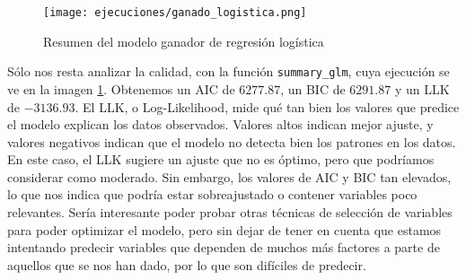 \documentclass[a4paper,onecolumn]{extarticle}
\begin{document}
\begin{sloppypar}
\begin{center}
    \begin{figure}[h]
        \centering
        \texttt{[image: ejecuciones/ganado\_logistica.png]}
        \caption{Resumen del modelo ganador de regresión logística}
        \label{fig:summarylog}
    \end{figure}
\end{center}

Sólo nos resta analizar la calidad, con la función \texttt{summary\_glm}, cuya ejecución se ve en la imagen \ref{fig:summarylog}. Obtenemos un AIC de $6277.87$, un BIC de 
$6291.87$ y un LLK de $-3136.93$. El LLK, o Log-Likelihood, mide qué tan bien los valores que predice el modelo explican los datos observados. Valores altos 
indican mejor ajuste, y valores negativos indican que el modelo no detecta bien los patrones en los datos. En este caso, el LLK sugiere un ajuste que no es 
óptimo, pero que podríamos considerar como moderado. Sin embargo, los valores de AIC y BIC tan elevados, lo que nos indica que podría estar sobreajustado o 
contener variables poco relevantes. Sería interesante poder probar otras técnicas de selección de variables para poder optimizar el modelo, pero sin dejar 
de tener en cuenta que estamos intentando predecir variables que dependen de muchos más factores a parte de aquellos que se nos han dado, por lo que son 
difíciles de predecir.

\end{sloppypar}
\end{document}
